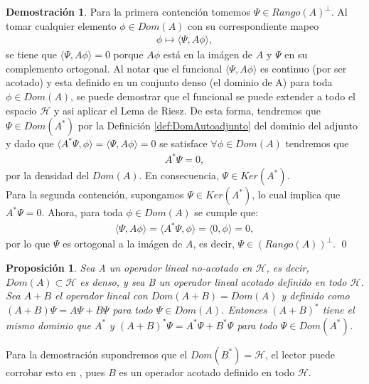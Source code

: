 \documentclass[12pt]{article}
\newtheorem{prop}[teo]{Proposición}
\theoremstyle{definition}
\newtheorem*{demo}{Demostración}
\begin{document}
\begin{demo}
    Para la primera contención
    tomemos $\Psi \in Rango(A)^{\perp}$. Al tomar cualquier elemento $\phi \in Dom(A)$ con su correspondiente mapeo 
    \begin{align*}
        \phi \mapsto \langle\Psi,A\phi\rangle,
    \end{align*}
    se tiene que $\langle\Psi,A\phi\rangle = 0$ porque $A\phi$ está en la imágen de $A$ y $\Psi$ en su complemento ortogonal. Al notar que el funcional $\langle\Psi,A\phi\rangle$ es continuo (por ser acotado) y esta definido en un conjunto denso (el dominio de A) para toda $\phi\in Dom(A)$, se puede demostrar que el funcional se puede extender a todo el espacio $\mathcal{H}$ y asi aplicar el Lema de Riesz. De esta forma, tendremos que $\Psi\in Dom(A^*)$ por la Definición \ref{def:DomAutoadjunto} del dominio del adjunto  y dado que $\langle A^*\Psi,\phi\rangle = \langle \Psi,A\phi\rangle=0$ se satisface $\forall \phi\in Dom(A)$ tendremos que
    \begin{align*}
        A^{*}\Psi = 0,
    \end{align*}
    por la densidad del $Dom(A)$. En consecuencia, $\Psi \in Ker(A^{*})$.
    \\
    Para la segunda contención, supongamos $\Psi \in Ker(A^{*})$, lo cual implica que $A^{*}\Psi = 0$. Ahora, para toda $\phi \in Dom(A)$ se cumple que:
    \begin{align*} \langle\Psi,A\phi\rangle = \langle A^{*}\Psi,\phi\rangle = \langle 0,\phi\rangle = 0,
    \end{align*}
    por lo que $\Psi$ es ortogonal a la imágen de $A$, es decir, $\Psi\in (Rango(A))^{\perp}$.
    \qed
\end{demo}
\begin{prop}
    Sea A un operador lineal no-acotado en $\mathcal{H}$, es decir, $Dom(A) \subset\mathcal{H}$ es denso, y sea B un operador lineal acotado definido en todo $\mathcal{H}$. Sea $A + B$ el operador lineal con $Dom(A+B) = Dom(A)$ y definido como $(A + B)\Psi = A\Psi + B\Psi$ para todo $\Psi \in Dom(A)$. Entonces $(A+B)^{*}$ tiene el mismo dominio que $A^{*}$ y $(A+B)^{*}\Psi = A^{*}\Psi + B^{*}\Psi$ para todo $\Psi \in Dom(A^{*})$.
\end{prop}
\noindent
Para la demostración supondremos que el $Dom(B^*)=\mathcal{H}$, el lector puede corrobar esto en \cite{Conway, Reed, Teschl}, pues $B$ es un operador acotado definido en todo $\mathcal{H}$.
\end{document}
